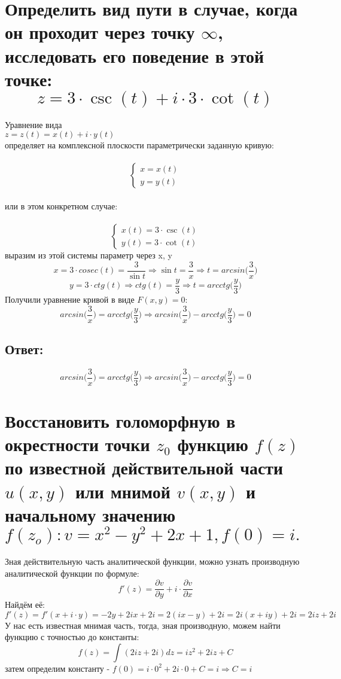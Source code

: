 \documentclass[12pt]{article}
\begin{document}
\section{Определить вид пути в случае, когда он проходит через точку $\infty$, исследовать его поведение в этой точке: $$z = 3 \cdot \csc(t) + i \cdot 3 \cdot \cot(t) $$}
Уравнение вида \\
$z = z(t) = x(t) + i \cdot y(t)$ \\
определяет на комплексной плоскости параметрически заданную кривую:\\ \\
\[
\begin{cases}
    x = x(t)\\
    y = y(t)
\end{cases}
\]
\\или в этом конкретном случае:\\ \\
\[
\begin{cases}
    x(t) = 3 \cdot \csc(t)\\
    y(t) = 3 \cdot \cot(t)
\end{cases}
\]
выразим из этой системы параметр через x, y\\
$$x = 3 \cdot cosec(t) = \frac{3}{\sin{t}} \Longrightarrow \sin{t} = \frac{3}{x} \Longrightarrow t = arcsin\bigg(\frac{3}{x} \bigg)$$
$$y = 3 \cdot ctg(t) \Longrightarrow ctg(t) = \frac{y}{3} \Longrightarrow t = arcctg \bigg(\frac{y}{3} \bigg)$$
Получили уравнение кривой в виде $F(x,y) = 0$:\\
$$arcsin\bigg(\frac{3}{x} \bigg) = arcctg \bigg(\frac{y}{3} \bigg) \Longrightarrow arcsin\bigg(\frac{3}{x} \bigg) - arcctg \bigg(\frac{y}{3} \bigg) = 0$$
\subsection*{Ответ:}
$$arcsin\bigg(\frac{3}{x} \bigg) = arcctg \bigg(\frac{y}{3} \bigg) \Longrightarrow arcsin\bigg(\frac{3}{x} \bigg) - arcctg \bigg(\frac{y}{3} \bigg) = 0$$

\section{Восстановить голоморфную в окрестности точки $z_0$ функцию $f(z)$ по известной действительной части $u(x,y)$ или мнимой $v(x,y)$ и начальному значению $f(z_o): v = x^2 - y^2 + 2x + 1, f(0) = i.$}
Зная действительную часть аналитической функции, можно узнать производную аналитической функции по формуле:
$$f'(z) = \frac{\partial v}{\partial y} + i \cdot \frac{\partial v}{\partial x}$$
Найдём её:
$$f'(z) = f'(x + i\cdot y) = -2y + 2ix + 2i = 2(ix - y) + 2i = 2i(x + iy) + 2i = 2iz + 2i$$
У нас есть известная мнимая часть, тогда, зная производную, можем найти функцию с точностью до константы:
$$f(z) = \int(2iz + 2i)dz = iz^2 + 2iz + C$$
затем определим константу - $f(0) = i \cdot 0^2 + 2i \cdot 0 + C = i \Longrightarrow C = i$
\end{document}
